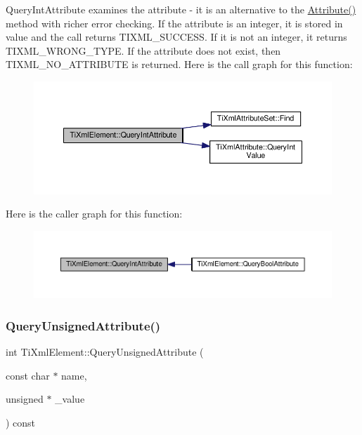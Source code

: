 Query\+Int\+Attribute examines the attribute -\/ it is an alternative to the \hyperlink{class_ti_xml_element_a6042f518748f475a7ac4b4e0b509eb05}{Attribute()} method with richer error checking. If the attribute is an integer, it is stored in \textquotesingle{}value\textquotesingle{} and the call returns T\+I\+X\+M\+L\+\_\+\+S\+U\+C\+C\+E\+SS. If it is not an integer, it returns T\+I\+X\+M\+L\+\_\+\+W\+R\+O\+N\+G\+\_\+\+T\+Y\+PE. If the attribute does not exist, then T\+I\+X\+M\+L\+\_\+\+N\+O\+\_\+\+A\+T\+T\+R\+I\+B\+U\+TE is returned. Here is the call graph for this function\+:
\nopagebreak
\begin{figure}[H]
\begin{center}
\leavevmode
\includegraphics[width=350pt]{class_ti_xml_element_a5c0f739e0f6f5905a201364532e54a60_cgraph}
\end{center}
\end{figure}
Here is the caller graph for this function\+:
\nopagebreak
\begin{figure}[H]
\begin{center}
\leavevmode
\includegraphics[width=350pt]{class_ti_xml_element_a5c0f739e0f6f5905a201364532e54a60_icgraph}
\end{center}
\end{figure}
\mbox{\label{class_ti_xml_element_ab75c83543d4ace62f4c40d7e8e392fc3}} 
\subsubsection{\texorpdfstring{Query\+Unsigned\+Attribute()}{QueryUnsignedAttribute()}}
{\footnotesize\ttfamily int Ti\+Xml\+Element\+::\+Query\+Unsigned\+Attribute (\begin{DoxyParamCaption}\item[{const char $\ast$}]{name,  }\item[{unsigned $\ast$}]{\+\_\+value }\end{DoxyParamCaption}) const}



